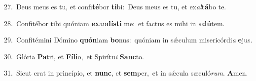{\numbfont\textcolor{\numbcolor}{27.}}~Deus meus es tu, et confi\-\textbf{té}\-bor \textbf{ti}\-bi:~\star Deus meus es tu, et ex\-\textit{al}\-\textbf{tá}bo te.\par
{\numbfont\textcolor{\numbcolor}{28.}}~Confitébor tibi quóniam \textbf{ex}\-au\-\textbf{dís}\-\textbf{ti} me:~\star et factus es mihi in \textit{sa}\-\textbf{lú}tem.\par
{\numbfont\textcolor{\numbcolor}{29.}}~Confitémini Dómino \textbf{quón}\-iam \textbf{bo}\-nus:~\star quóniam in sǽculum misericórdi\textit{a} \textbf{e}\-jus.\par
{\numbfont\textcolor{\numbcolor}{30.}}~Glória \textbf{Pa}\-tri, et \textbf{Fí}\-\textbf{li}o,~\star et Spirítu\textit{i} \textbf{Sanc}\-to.\par
{\numbfont\textcolor{\numbcolor}{31.}}~Sicut erat in princípio, et \textbf{nunc}\-, et \textbf{sem}\-per,~\star et in sǽcula sæculó\-\textit{rum}\-. \textbf{A}\-men.\par
